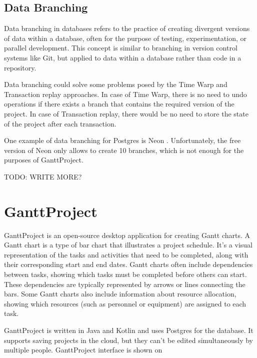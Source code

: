 \documentclass[a4paper, 11pt, oneside]{article}
\theoremstyle{definition}
\begin{document}
\subsection{Data Branching}

Data branching in databases refers to the practice of creating divergent versions of data within a database, often for the purpose of testing, experimentation, or parallel development. This concept is similar to branching in version control systems like Git, but applied to data within a database rather than code in a repository.

Data branching could solve some problems posed by the Time Warp and Transaction replay approaches. In case of Time Warp, there is no need to undo operations if there exists a branch that contains the required version of the project. In case of Transaction replay, there would be no need to store the state of the project after each transaction. 

One example of data branching for Postgres is Neon \cite{neon}. Unfortunately, the free version of Neon only allows to create 10 branches, which is not enough for the purposes of GanttProject.

TODO: WRITE MORE?

\section{GanttProject}

GanttProject is an open-source desktop application for creating Gantt charts. A Gantt chart is a type of bar chart that illustrates a project schedule. It's a visual representation of the tasks and activities that need to be completed, along with their corresponding start and end dates. Gantt charts often include dependencies between tasks, showing which tasks must be completed before others can start. These dependencies are typically represented by arrows or lines connecting the bars. Some Gantt charts also include information about resource allocation, showing which resources (such as personnel or equipment) are assigned to each task.

GanttProject is written in Java and Kotlin and uses Postgres for the database. It supports saving projects in the cloud, but they can't be edited simultaneously by multiple people. GanttProject interface is shown on  
\end{document}
